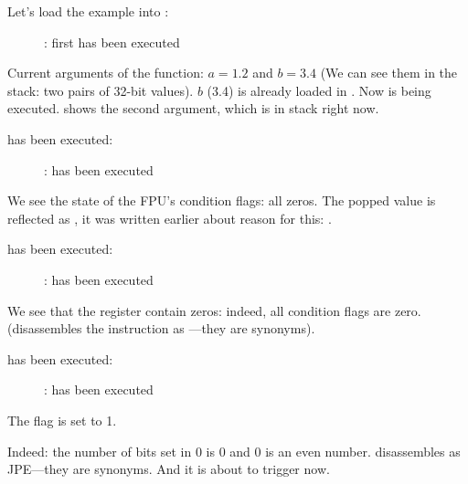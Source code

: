 ﻿\clearpage
{}
\myindex{\olly}

Let's load the example into \olly:

\begin{figure}[H]
\centering
{}
\caption{\olly: first \FLD has been executed}
\label{fig:FPU_comparison_case1_olly1}
\end{figure}

Current arguments of the function: $a=1.2$ and $b=3.4$ (We can see them in the stack: two pairs of 32-bit values).
$b$ (3.4) is already loaded in .
Now \FCOMP is being executed. 
\olly shows the second \FCOMP argument, which is in stack right now.

\clearpage
\FCOMP has been executed:

\begin{figure}[H]
\centering
{}
\caption{\olly: \FCOMP has been executed}
\label{fig:FPU_comparison_case1_olly2}
\end{figure}

We see the state of the \ac{FPU}'s condition flags: all zeros.
The popped value is reflected as , it was written earlier about reason for this: 
.

\clearpage
\FNSTSW has been executed:
\begin{figure}[H]
\centering
{}
\caption{\olly: \FNSTSW has been executed}
\label{fig:FPU_comparison_case1_olly3}
\end{figure}

We see that the  register contain zeros: indeed, all condition flags are zero.
(\olly disassembles the \FNSTSW instruction as ---they are synonyms).

\clearpage
\TEST has been executed:

\begin{figure}[H]
\centering
{}
\caption{\olly: \TEST has been executed}
\label{fig:FPU_comparison_case1_olly4}
\end{figure}

The  flag is set to 1.

Indeed: the number of bits set in 0 is 0 and 0 is an even number.
\olly disassembles  as \ac{JPE}---they are synonyms.
And it is about to trigger now.

